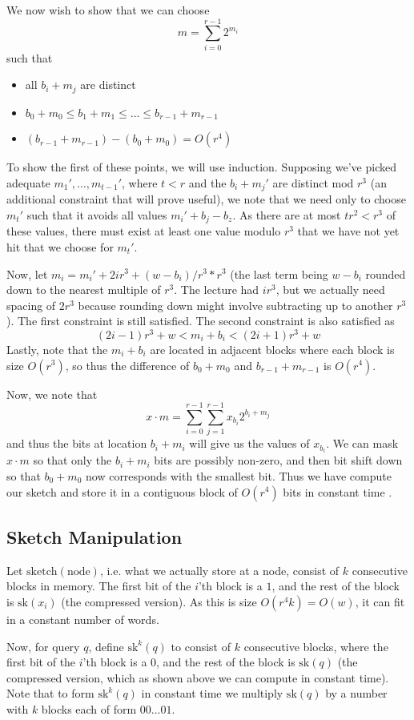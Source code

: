 \documentclass[11pt]{article}
\begin{document}
We now wish to show that we can choose $$m=\sum_{i=0}^{r-1}2^{m_i}$$ such that
\begin{itemize}
\item all $b_i + m_j$ are distinct
\item $b_0 + m_0 \leq b_1 + m_1\leq\ldots\leq b_{r-1} + m_{r-1}$
\item $(b_{r-1} + m_{r-1}) - (b_0 + m_0) = O(r^4)$
\end{itemize}
To show the first of these points, we will use induction. Supposing we've picked adequate $m_1',\ldots,m_{t-1}'$, where $t<r$ and the $b_i + m_j'$ are distinct mod $r^3$ (an additional constraint that will prove useful), we note that we need only to choose $m_t'$ such that it avoids all values $m_i' + b_j - b_z$. As there are at most $tr^2<r^3$ of these values, there must exist at least one value modulo $r^3$ that we have not yet hit that we choose for $m_t'$.

Now, let $m_i = m_i' + 2ir^3 + (w - b_i) / r^3 * r^3$ (the last term being $w-b_i$ rounded down to the nearest multiple of $r^3$. The lecture had $ir^3$, but we actually need spacing of $2r^3$ because rounding down might involve subtracting up to another $r^3$). The first constraint is still satisfied. The second constraint is also satisfied as $$(2i-1)r^3 + w< m_i + b_i < (2i+1) r^3 + w$$ Lastly, note that the $m_i + b_i$ are located in adjacent blocks where each block is size $O(r^3)$, so thus the difference of $b_0+m_0$ and $b_{r-1} + m_{r-1}$ is $O(r^4)$.

Now, we note that
$$x\cdot m = \sum_{i=0}^{r-1}\sum_{j=1}^{r-1}x_{b_i}2^{b_i + m_j}$$
 and thus the bits at location $b_i + m_i$ will give us the values of $x_{b_i}$. We can mask $x\cdot m$ so that only the $b_i+m_i$ bits are possibly non-zero, and then bit shift down so that $b_0 + m_0$ now corresponds with the smallest bit. Thus we have compute our sketch and store it in a contiguous block of $O(r^4)$ bits in constant time .

\subsection{Sketch Manipulation}
Let $\text{sketch}(\text{node})$, i.e. what we actually store at a node, consist of $k$ consecutive blocks in memory. The first bit of the $i$'th block is a $1$, and the rest of the block is $\text{sk}(x_i)$ (the compressed version). As this is size $O(r^4k) = O(w)$, it can fit in a constant number of words.

Now, for query $q$, define $\text{sk}^k(q)$ to consist of $k$ consecutive blocks, where the first bit of the $i$'th block is a $0$, and the rest of the block is $\text{sk}(q)$ (the compressed version, which as shown above we can compute in constant time). Note that to form $\text{sk}^k(q)$ in constant time we multiply $\text{sk}(q)$ by a number with $k$ blocks each of form $00\ldots 01$.
\end{document}
